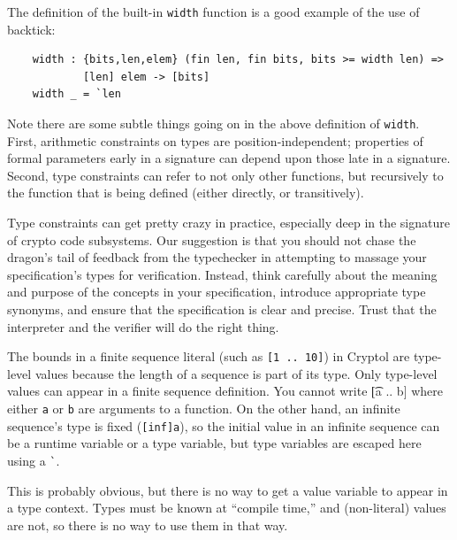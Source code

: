 The definition of the built-in {\tt width} function is a good example
of the use of backtick:
\begin{Verbatim}
    width : {bits,len,elem} (fin len, fin bits, bits >= width len) =>
            [len] elem -> [bits]
    width _ = `len
\end{Verbatim}

\begin{tip}
  Note there are some subtle things going on in the above definition
  of \texttt{width}.  First, arithmetic constraints on types are
  position-independent; properties of formal parameters early in a
  signature can depend upon those late in a signature.  Second, type
  constraints can refer to not only other functions, but recursively
  to the function that is being defined (either directly, or
  transitively).

  Type constraints can get pretty crazy in practice, especially deep
  in the signature of crypto code subsystems.  Our suggestion is that
  you should not chase the dragon's tail of feedback from the
  typechecker in attempting to massage your specification's types for
  verification.  Instead, think carefully about the meaning and
  purpose of the concepts in your specification, introduce appropriate
  type synonyms, and ensure that the specification is clear and
  precise.  Trust that the interpreter and the verifier will do the
  right thing.
\end{tip}

The bounds in a finite sequence literal (such as {\tt [1 .. 10]}) in
Cryptol are type-level values because the length of a sequence is part
of its type.  Only type-level values can appear in a finite sequence
definition.  You cannot write {\t [a .. b]} where either {\tt a} or
{\tt b} are arguments to a function.  On the other hand, an infinite
sequence's type is fixed ({\tt [inf]a}), so the initial value in an
infinite sequence can be a runtime variable or a type variable, but
type variables are escaped here using a {\tt \Verb|`|}.



This is probably obvious, but there is no way to get a value variable
to appear in a type context.  Types must be known at ``compile time,''
and (non-literal) values are not, so there is no way to use them in
that way.

